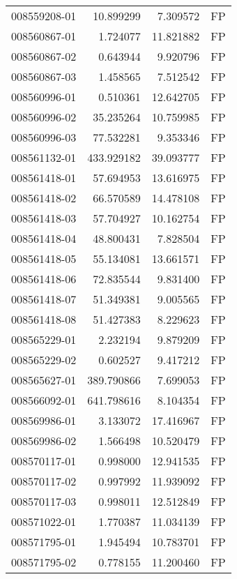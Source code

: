 \begin{tabular}{lrrl}
008559208-01 &   10.899299 &       7.309572 &   FP \\
008560867-01 &    1.724077 &      11.821882 &   FP \\
008560867-02 &    0.643944 &       9.920796 &   FP \\
008560867-03 &    1.458565 &       7.512542 &   FP \\
008560996-01 &    0.510361 &      12.642705 &   FP \\
008560996-02 &   35.235264 &      10.759985 &   FP \\
008560996-03 &   77.532281 &       9.353346 &   FP \\
008561132-01 &  433.929182 &      39.093777 &   FP \\
008561418-01 &   57.694953 &      13.616975 &   FP \\
008561418-02 &   66.570589 &      14.478108 &   FP \\
008561418-03 &   57.704927 &      10.162754 &   FP \\
008561418-04 &   48.800431 &       7.828504 &   FP \\
008561418-05 &   55.134081 &      13.661571 &   FP \\
008561418-06 &   72.835544 &       9.831400 &   FP \\
008561418-07 &   51.349381 &       9.005565 &   FP \\
008561418-08 &   51.427383 &       8.229623 &   FP \\
008565229-01 &    2.232194 &       9.879209 &   FP \\
008565229-02 &    0.602527 &       9.417212 &   FP \\
008565627-01 &  389.790866 &       7.699053 &   FP \\
008566092-01 &  641.798616 &       8.104354 &   FP \\
008569986-01 &    3.133072 &      17.416967 &   FP \\
008569986-02 &    1.566498 &      10.520479 &   FP \\
008570117-01 &    0.998000 &      12.941535 &   FP \\
008570117-02 &    0.997992 &      11.939092 &   FP \\
008570117-03 &    0.998011 &      12.512849 &   FP \\
008571022-01 &    1.770387 &      11.034139 &   FP \\
008571795-01 &    1.945494 &      10.783701 &   FP \\
008571795-02 &    0.778155 &      11.200460 &   FP \\

\end{tabular}
